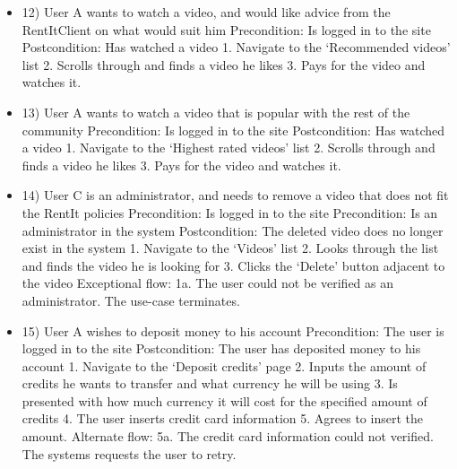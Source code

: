 \begin{itemize}
\item 12) 
User A wants to watch a video, and would like advice from the RentItClient on what would suit him
\newline Precondition: Is logged in to the site
\newline Postcondition: Has watched a video
    1. Navigate to the ‘Recommended videos’ list
    2. Scrolls through and finds a video he likes
    3. Pays for the video and watches it.

\item 13) 
User A wants to watch a video that is popular with the rest of the community
\newline Precondition: Is logged in to the site
\newline Postcondition: Has watched a video
    1. Navigate to the ‘Highest rated videos’ list
    2. Scrolls through and finds a video he likes
    3. Pays for the video and watches it.

\item 14)
User C is an administrator, and needs to remove a video that does not fit the RentIt policies
\newline Precondition: Is logged in to the site
\newline Precondition: Is an administrator in the system
\newline Postcondition: The deleted video does no longer exist in the system
    1. Navigate to the ‘Videos’ list
    2. Looks through the list and finds the video he is looking for
    3. Clicks the ‘Delete’ button adjacent to the video
\newline Exceptional flow:
    1a. The user could not be verified as an administrator. The use-case terminates.

\item 15)
User A wishes to deposit money to his account
\newline Precondition: The user is logged in to the site
\newline Postcondition: The user has deposited money to his account
    1. Navigate to the ‘Deposit credits’ page
    2. Inputs the amount of credits he wants to transfer and what currency he will be using
    3. Is presented with how much currency it will cost for the specified amount of credits
    4. The user inserts credit card information
    5. Agrees to insert the amount.
\newline Alternate flow:
    5a. The credit card information could not verified. The systems requests the user to retry.


\end{itemize}
